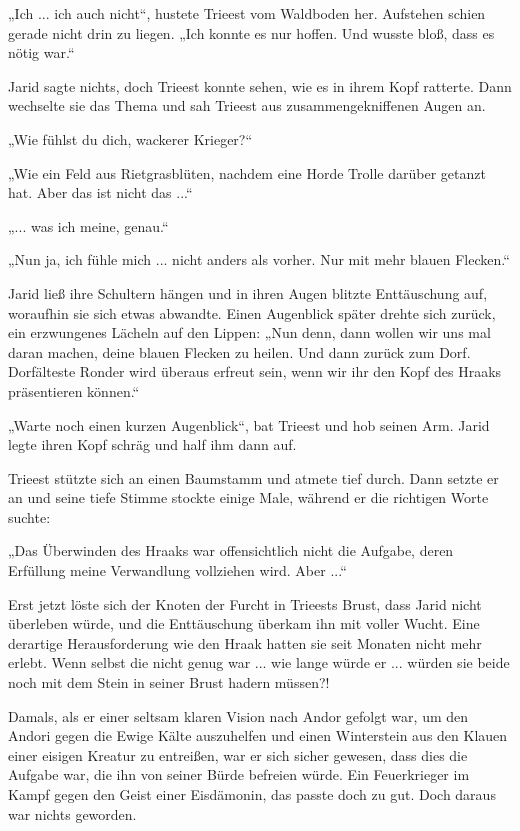„Ich ... ich auch nicht“, hustete Trieest vom Waldboden her. Aufstehen schien gerade nicht drin zu liegen. „Ich konnte es nur hoffen. Und wusste bloß, dass es nötig war.“

Jarid sagte nichts, doch Trieest konnte sehen, wie es in ihrem Kopf ratterte. Dann wechselte sie das Thema und sah Trieest aus zusammengekniffenen Augen an.

„Wie fühlst du dich, wackerer Krieger?“

„Wie ein Feld aus Rietgrasblüten, nachdem eine Horde Trolle darüber getanzt hat. Aber das ist nicht das ...“

„... was ich meine, genau.“

„Nun ja, ich fühle mich ... nicht anders als vorher. Nur mit mehr blauen Flecken.“

Jarid ließ ihre Schultern hängen und in ihren Augen blitzte Enttäuschung auf, woraufhin sie sich etwas abwandte. Einen Augenblick später drehte sich zurück, ein erzwungenes Lächeln auf den Lippen: „Nun denn, dann wollen wir uns mal daran machen, deine blauen Flecken zu heilen. Und dann zurück zum Dorf. Dorfälteste Ronder wird überaus erfreut sein, wenn wir ihr den Kopf des Hraaks präsentieren können.“

„Warte noch einen kurzen Augenblick“, bat Trieest und hob seinen Arm. Jarid legte ihren Kopf schräg und half ihm dann auf.

Trieest stützte sich an einen Baumstamm und atmete tief durch. Dann setzte er an und seine tiefe Stimme stockte einige Male, während er die richtigen Worte suchte:

„Das Überwinden des Hraaks war offensichtlich nicht die Aufgabe, deren Erfüllung meine Verwandlung vollziehen wird. Aber ...“

Erst jetzt löste sich der Knoten der Furcht in Trieests Brust, dass Jarid nicht überleben würde, und die Enttäuschung überkam ihn mit voller Wucht. Eine derartige Herausforderung wie den Hraak hatten sie seit Monaten nicht mehr erlebt. Wenn selbst die nicht genug war ... wie lange würde er ... würden sie beide noch mit dem Stein in seiner Brust hadern müssen?!

Damals, als er einer seltsam klaren Vision nach Andor gefolgt war, um den Andori gegen die Ewige Kälte auszuhelfen und einen Winterstein aus den Klauen einer eisigen Kreatur zu entreißen, war er sich sicher gewesen, dass dies die Aufgabe war, die ihn von seiner Bürde befreien würde. Ein Feuerkrieger im Kampf gegen den Geist einer Eisdämonin, das passte doch zu gut. Doch daraus war nichts geworden.

